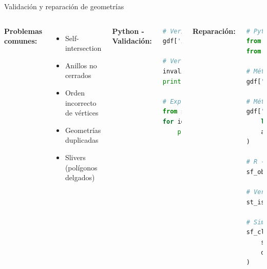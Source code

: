 \documentclass[10pt,aspectratio=169]{beamer}
\begin{document}
\begin{frame}[fragile]{Validación y reparación de geometrías}
    \begin{columns}[T]
        \textbf{Problemas comunes:}
        \begin{itemize}
            \item Self-intersection
            \item Anillos no cerrados
            \item Orden incorrecto de vértices
            \item Geometrías duplicadas
            \item Slivers (polígonos delgados)
        \end{itemize}
        
        \vspace{0.3cm}
        
        \textbf{Python - Validación:}
        \begin{lstlisting}[language=Python]
# Verificar validez
gdf['is_valid'] = gdf.is_valid

# Ver problemas
invalid = gdf[~gdf.is_valid]
print(invalid)

# Explicación del problema
from shapely.validation import explain_validity
for idx, row in invalid.iterrows():
    print(explain_validity(row.geometry))
        \end{lstlisting}
        
        \textbf{Reparación:}
        \begin{lstlisting}[language=Python]
# Python - Reparar
from shapely.geometry import Polygon
from shapely.validation import make_valid

# Método 1: buffer(0)
gdf['geometry'] = gdf.buffer(0)

# Método 2: make_valid
gdf['geometry'] = gdf.apply(
    lambda x: make_valid(x.geometry),
    axis=1
)

# R - Reparación
sf_obj <- st_make_valid(sf_obj)

# Verificar
st_is_valid(sf_obj)

# Simplificar para eliminar slivers
sf_clean <- st_simplify(
    sf_obj,
    dTolerance = 0.001
)
        \end{lstlisting}
    \end{columns}
\end{frame}
\end{document}
